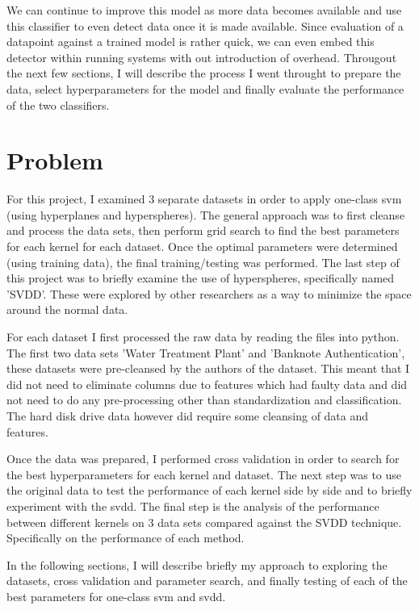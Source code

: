 \documentclass[journal]{IEEEtran}
\begin{document}
We can continue to improve this model as more data becomes available and use this classifier to even detect data once it is made available. Since evaluation of a datapoint against a trained model is rather quick, we can even embed this detector within running systems with out introduction of overhead. Througout the next few sections, I will describe the process I went throught to prepare the data, select hyperparameters for the model and finally evaluate the performance of the two classifiers.


\section{Problem}
For this project, I examined 3 separate datasets in order to apply one-class svm (using hyperplanes and hyperspheres). The general approach was to first cleanse and process the data sets, then perform grid search to find the best parameters for each kernel for each dataset. Once the optimal parameters were determined (using training data), the final training/testing was performed. The last step of this project was to briefly examine the use of hyperspheres, specifically named 'SVDD'. These were explored by other researchers as a way to minimize the space around the normal data. \cite{Tax}

For each dataset I first processed the raw data by reading the files into python. The first two data sets 'Water Treatment Plant'\cite{UCI:ML} and 'Banknote Authentication'\cite{UCI:ML}, these datasets were pre-cleansed by the authors of the dataset.
This meant that I did not need to eliminate columns due to features which had faulty data and did not need to do any pre-processing other than standardization
and classification. The hard disk drive data \cite{hdd} however did require some cleansing of data and features. 

Once the data was prepared, I performed cross validation in order to search for the best hyperparameters for each kernel and dataset. The next step was to use the original data to test the performance of each kernel side by side and to briefly experiment with the svdd. The final step is the analysis of the performance between different kernels on 3 data sets compared against the SVDD technique. Specifically on the performance of each method.

In the following sections, I will describe briefly my approach to exploring the datasets, cross validation and parameter search, and finally testing of each of the best parameters for one-class svm and svdd.
\end{document}
